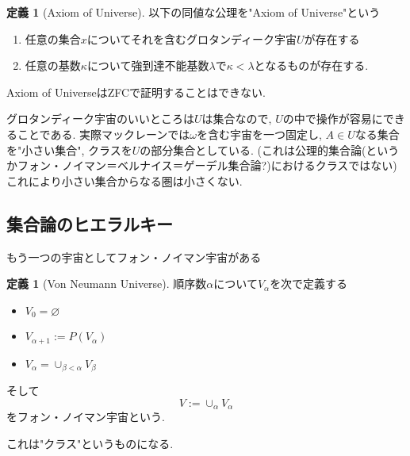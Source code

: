 \documentclass[dvipdfmx,a4paper,11pt]{report}
\theoremstyle{definition}
\newtheorem{dfn}[thm]{定義}
\newtheorem{rem}[thm]{注意}
\begin{document}
 \begin{tcolorbox}
 [colback = white, colframe = green!35!black, fonttitle = \bfseries,breakable = true]
\begin{dfn}[Axiom of Universe]
以下の同値な公理を"Axiom of Universe"という
\begin{enumerate}
\item 任意の集合$x$についてそれを含むグロタンディーク宇宙$U$が存在する
\item 任意の基数$\kappa$について強到達不能基数$\lambda$で$\kappa < \lambda$となるものが存在する. 
\end{enumerate}
\end{dfn}
\end{tcolorbox}
Axiom of UniverseはZFCで証明することはできない.

グロタンディーク宇宙のいいところは$U$は集合なので, $U$の中で操作が容易にできることである.
実際マックレーンでは$\omega$を含む宇宙を一つ固定し, $A \in U$なる集合を"小さい集合", クラスを$U$の部分集合としている. (これは公理的集合論(というかフォン・ノイマン＝ベルナイス＝ゲーデル集合論?)におけるクラスではない)
これにより小さい集合からなる圏は小さくない. 

\subsection{集合論のヒエラルキー}

もう一つの宇宙としてフォン・ノイマン宇宙がある
 \begin{tcolorbox}
 [colback = white, colframe = green!35!black, fonttitle = \bfseries,breakable = true]
\begin{dfn}[Von Neumann Universe]
順序数$\alpha$について$V_{\alpha}$を次で定義する
\begin{itemize}
\item $V_{0} = \varnothing$ 
\item $V_{\alpha+1}:=P(V_{\alpha})$
\item $V_{\alpha}= \cup_{\beta < \alpha} V_{\beta}$
\end{itemize}
そして
$$
V := \cup_{\alpha} V_{\alpha}
$$
をフォン・ノイマン宇宙という.
\end{dfn}
\end{tcolorbox}
これは"クラス"というものになる. 

\end{document}
